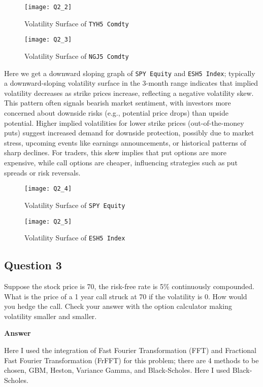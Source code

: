 \documentclass[letterpaper]{article}
\begin{document}
	\begin{figure}[h]
			\caption{Volatility Surface of \texttt{TYH5 Comdty}}
		\centering
		\texttt{[image: Q2\_2]}
	\end{figure}

\begin{figure}[h]
	\caption{Volatility Surface of \texttt{NGJ5 Comdty}}
	\centering
	\texttt{[image: Q2\_3]}
\end{figure}

\clearpage

Here we get a downward sloping graph of \texttt{SPY Equity} and \texttt{ESH5 Index}; typically a  downward-sloping volatility surface in the 3-month range indicates that implied volatility decreases as strike prices increase, reflecting a negative volatility skew. This pattern often signals bearish market sentiment, with investors more concerned about downside risks (e.g., potential price drops) than upside potential. Higher implied volatilities for lower strike prices (out-of-the-money puts) suggest increased demand for downside protection, possibly due to market stress, upcoming events like earnings announcements, or historical patterns of sharp declines. For traders, this skew implies that put options are more expensive, while call options are cheaper, influencing strategies such as put spreads or risk reversals. 

\begin{figure}[h]
	\caption{Volatility Surface of \texttt{SPY Equity}}
	\centering
	\texttt{[image: Q2\_4]}
\end{figure}
\begin{figure}[h]
	\caption{Volatility Surface of \texttt{ESH5 Index}}
	\centering
	\texttt{[image: Q2\_5]}
\end{figure}

	\clearpage
	
	\subsection*{Question 3}
	 Suppose the stock price is 70, the risk-free rate is 5\% continuously compounded. What is the price of a 1 year call struck at 70 if the volatility is 0. How would you hedge the call. Check your answer with the option calculator making volatility smaller and smaller.
	 
	 \textbf{Answer}
	 
	 Here I used the integration of Fast Fourier Transformation (FFT) and Fractional Fast Fourier Transformation (FrFFT) for this problem; there are 4 methods to be chosen, GBM, Heston, Variance Gamma, and Black-Scholes. Here I used Black-Scholes.
	 
\end{document}
